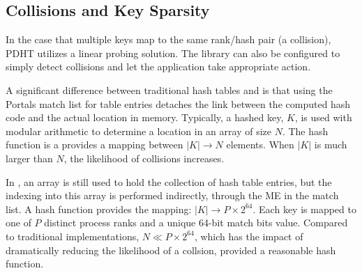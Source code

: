 \subsection{Collisions and Key Sparsity}

In the case that multiple keys map to the same rank/hash pair (a
collision), PDHT utilizes a linear probing solution. The library can
also be configured to simply detect collisions and let the application
take appropriate action. 

A significant difference between traditional hash tables and \pdht is
that using the Portals match list for table entries detaches the link
between the computed hash code and the actual location in
memory. Typically, a hashed key, $K$,  is used with modular arithmetic to
determine a location in an array of size $N$. The hash function is a
provides a mapping between $|K| \rightarrow N$ elements. When $|K|$ is
much larger than $N$, the likelihood of collisions increases.

In \pdht, an array is still used to hold the collection of hash table
entries, but the indexing into this array is performed indirectly,
through the ME in the match list. A \pdht hash function provides the 
mapping: $|K| \rightarrow P \times 2^{64}$. Each key is mapped to one
of $P$ distinct process ranks and a unique 64-bit match bits
value. Compared to traditional implementations, $N \ll  P \times
2^{64}$, which has the impact of dramatically reducing the likelihood
of a collsion, provided a reasonable hash function.


